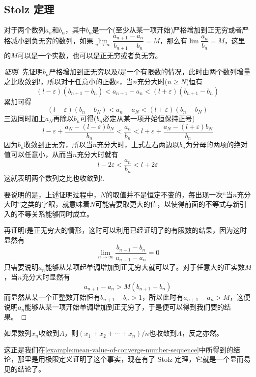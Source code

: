 \subsection{Stolz 定理}
\label{sec:stolz-theorem}

\begin{theorem}[Stolz 定理]
  对于两个数列$a_n$和$b_n$，其中$b_n$是一个(至少从某一项开始)严格增加到正无穷或者严格减小到负无穷的数列，如果$\lim\limits_{n\to\infty}\dfrac{a_{n+1}-a_n}{b_{n+1}-b_n} = M$，那么有$\lim\limits \dfrac{a_n}{b_n} = M$，这里的$M$可以是一个实数，也可以是正无穷或者负无穷。
\end{theorem}

\begin{proof}[证明]
  先证明$b_n$严格增加到正无穷以及$l$是一个有限数的情况，此时由两个数列增量之比收敛到$l$，所以对于任意小的正数$\varepsilon$，当$n$充分大时($n \geqslant N$)恒有
  \[ (l-\varepsilon)(b_{n+1}-b_n) < a_{n+1}-a_n < (l+\varepsilon)(b_{n+1}-b_n) \]
  累加可得
  \[ (l-\varepsilon)(b_{n}-b_N) < a_{n}-a_N < (l+\varepsilon)(b_{n}-b_N) \]
  三边同时加上$a_N$再除以$b_n$可得($b_n$必定从某一项开始恒保持正号)
  \[ l-\varepsilon+\frac{a_N-(l-\varepsilon)b_N}{b_n} < \frac{a_n}{b_n} < l+\varepsilon+\frac{a_N-(l+\varepsilon)b_N}{b_n}\]
  因为$b_n$收敛到正无穷，所以当$n$充分大时，上式左右两边以$b_n$为分母的两项的绝对值可以任意小，从而当$n$充分大时就有
  \[ l-2\varepsilon < \frac{a_n}{b_n} < l + 2\varepsilon \]
  这就表明两个数列之比也收敛到$l$.

  要说明的是，上述证明过程中，$N$的取值并不是恒定不变的，每出现一次“当$n$充分大时”之类的字眼，就意味着$N$可能需要取更大的值，以使得前面的不等式与新引入的不等关系能够同时成立。

  再证明$l$是正无穷大的情形，这时可以利用已经证明了的有限数的结果，因为这时显然有
  \[ \lim_{n \to \infty} \frac{b_{n+1}-b_n}{a_{n+1}-a_n} = 0 \]
  只需要说明$a_n$能够从某项起单调增加到正无穷大就可以了。对于任意大的正实数$M$，当$n$充分大时显然有
  \[ a_{n+1}-a_n > M(b_{n+1}-b_n) \]
  而显然从某一个正整数开始恒有$b_{n+1}-b_n>1$，所以此时有$a_{n+1}-a_n>M$，这便说明$a_n$能够从某一项开始单调增加到正无穷了，于是便可以得到我们要的结果。
\end{proof}

\begin{inference}
  如果数列$x_n$收敛到$A$，则$(x_1+x_2+\cdots+x_n)/n$也收敛到$A$，反之亦然。
\end{inference}

这正是我们在\autoref{example:mean-value-of-converge-number-sequence}中所得到的结论，那里是用极限定义证明了这个事实，现在有了 Stolz 定理，它就是一个显而易见的结论了。

